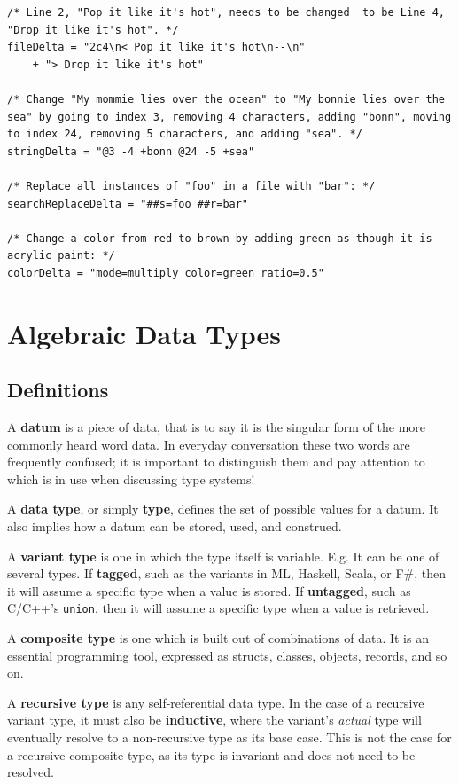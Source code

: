 \documentclass[12pt,a4paper]{article}
\begin{document}
		\begin{lstlisting}
/* Line 2, "Pop it like it's hot", needs to be changed  to be Line 4, "Drop it like it's hot". */
fileDelta = "2c4\n< Pop it like it's hot\n--\n"
	+ "> Drop it like it's hot"

/* Change "My mommie lies over the ocean" to "My bonnie lies over the sea" by going to index 3, removing 4 characters, adding "bonn", moving to index 24, removing 5 characters, and adding "sea". */
stringDelta = "@3 -4 +bonn @24 -5 +sea"

/* Replace all instances of "foo" in a file with "bar": */
searchReplaceDelta = "##s=foo ##r=bar"

/* Change a color from red to brown by adding green as though it is acrylic paint: */
colorDelta = "mode=multiply color=green ratio=0.5"
		\end{lstlisting}
	
	\section{Algebraic Data Types}
		
		\subsection{Definitions}
		
		A \textbf{datum} is a piece of data, that is to say it is the singular form of the more commonly heard word data. In everyday conversation these two words are frequently confused; it is important to distinguish them and pay attention to which is in use when discussing type systems!
		
		A \textbf{data type}, or simply \textbf{type}, defines the set of possible values for a datum. It also implies how a datum can be stored, used, and construed.
		
		A \textbf{variant type} is one in which the type itself is variable. E.g. It can be one of several types. If \textbf{tagged}, such as the variants in ML, Haskell, Scala, or F\#, then it will assume a specific type when a value is stored. If \textbf{untagged}, such as C/C++'s \texttt{union}, then it will assume a specific type when a value is retrieved.
		
		A \textbf{composite type} is one which is built out of combinations of data. It is an essential programming tool, expressed as structs, classes, objects, records, and so on.
		
		A \textbf{recursive type} is any self-referential data type. In the case of a recursive variant type, it must also be \textbf{inductive}, where the variant's \textit{actual} type will eventually resolve to a non-recursive type as its base case. This is not the case for a recursive composite type, as its type is invariant and does not need to be resolved.
				
\end{document}
